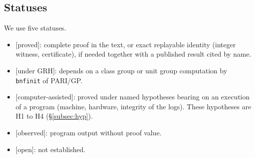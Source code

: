 \documentclass[11pt,a4paper]{amsart}
\theoremstyle{plain}
\theoremstyle{definition}
\numberwithin{equation}{section}
\newcommand{\st}[1]{\textup{\textsf{\small[#1]}}}
\newcommand{\DEM}{\st{proved}}
\newcommand{\GRH}{\st{under GRH}}
\newcommand{\ASS}{\st{computer-assisted}}
\newcommand{\CONS}{\st{observed}}
\newcommand{\OUV}{\st{open}}
\begin{document}
\subsection{Statuses}\label{subsec:statuts}
We use five statuses.
\begin{itemize}
\item \DEM{}: complete proof in the text, or exact replayable identity (integer witness, certificate), if needed together with a published result cited by name.
\item \GRH{}: depends on a class group or unit group computation by \texttt{bnfinit} of PARI/GP.
\item \ASS{}: proved under named hypotheses bearing on an execution of a program (machine, hardware, integrity of the logs). These hypotheses are H1 to H4 (\S\ref{subsec:hyp}).
\item \CONS{}: program output without proof value.
\item \OUV{}: not established.
\end{itemize}
\end{document}
